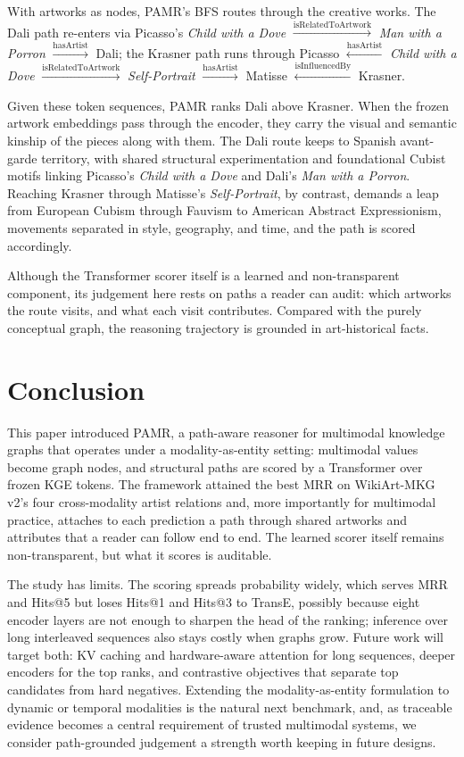 \documentclass[runningheads]{llncs}
\begin{document}
With artworks as nodes, PAMR's BFS routes through the creative works. The Dali path re-enters via Picasso's \textit{Child with a Dove} $\xrightarrow{\text{isRelatedToArtwork}}$ \textit{Man with a Porron} $\xrightarrow{\text{hasArtist}}$ Dali; the Krasner path runs through Picasso $\xleftarrow{\text{hasArtist}}$ \textit{Child with a Dove} $\xrightarrow{\text{isRelatedToArtwork}}$ \textit{Self-Portrait} $\xrightarrow{\text{hasArtist}}$ Matisse $\xleftarrow{\text{isInfluencedBy}}$ Krasner.

Given these token sequences, PAMR ranks Dali above Krasner. When the frozen artwork embeddings pass through the encoder, they carry the visual and semantic kinship of the pieces along with them. The Dali route keeps to Spanish avant-garde territory, with shared structural experimentation and foundational Cubist motifs linking Picasso's \textit{Child with a Dove} and Dali's \textit{Man with a Porron}. Reaching Krasner through Matisse's \textit{Self-Portrait}, by contrast, demands a leap from European Cubism through Fauvism to American Abstract Expressionism, movements separated in style, geography, and time, and the path is scored accordingly.

Although the Transformer scorer itself is a learned and non-transparent component, its judgement here rests on paths a reader can audit: which artworks the route visits, and what each visit contributes. Compared with the purely conceptual graph, the reasoning trajectory is grounded in art-historical facts.

\section{Conclusion}
\label{sec:conclusion}

This paper introduced PAMR, a path-aware reasoner for multimodal knowledge graphs that operates under a modality-as-entity setting: multimodal values become graph nodes, and structural paths are scored by a Transformer over frozen KGE tokens. The framework attained the best MRR on WikiArt-MKG v2's four cross-modality artist relations and, more importantly for multimodal practice, attaches to each prediction a path through shared artworks and attributes that a reader can follow end to end. The learned scorer itself remains non-transparent, but what it scores is auditable.

The study has limits. The scoring spreads probability widely, which serves MRR and Hits@5 but loses Hits@1 and Hits@3 to TransE, possibly because eight encoder layers are not enough to sharpen the head of the ranking; inference over long interleaved sequences also stays costly when graphs grow. Future work will target both: KV caching and hardware-aware attention for long sequences, deeper encoders for the top ranks, and contrastive objectives that separate top candidates from hard negatives. Extending the modality-as-entity formulation to dynamic or temporal modalities is the natural next benchmark, and, as traceable evidence becomes a central requirement of trusted multimodal systems, we consider path-grounded judgement a strength worth keeping in future designs.
\end{document}
